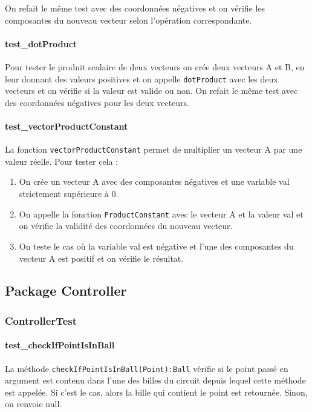 \documentclass{report}
\begin{document}
On refait le même test avec des coordonnées négatives et on vérifie les composantes du nouveau vecteur selon l’opération correspondante.

\newpage
\paragraph{test\_dotProduct}

Pour tester le produit scalaire de deux vecteurs on crée deux vecteurs A et B,
en leur donnant des valeurs positives et on appelle \texttt{dotProduct} avec les deux vecteurs et on vérifie si la valeur est valide ou non.
On refait le même test avec des coordonnées négatives pour les deux vecteurs.

\paragraph{test\_vectorProductConstant}

La fonction \texttt{vectorProductConstant} permet de multiplier un vecteur A par une valeur réelle.
Pour tester cela :
\begin{enumerate}
\item On crée un vecteur A avec des composantes négatives et une variable val strictement supérieure à 0.
\item On appelle la fonction \texttt{ProductConstant} avec le vecteur A et la valeur val et on vérifie la validité des coordonnées du nouveau vecteur.
\item On teste le cas où la variable val est négative et l’une des composantes du vecteur A est positif et on vérifie le résultat.
\end{enumerate}

\subsection{Package Controller}

\subsubsection{ControllerTest}

\paragraph{test\_checkIfPointIsInBall}

La méthode \texttt{checkIfPointIsInBall(Point):Ball} vérifie si le point passé en argument est contenu dans l’une des billes du circuit depuis lequel cette méthode est appelée. Si c’est le cas, alors la bille qui contient le point est retournée. Sinon, on renvoie null.
\end{document}
